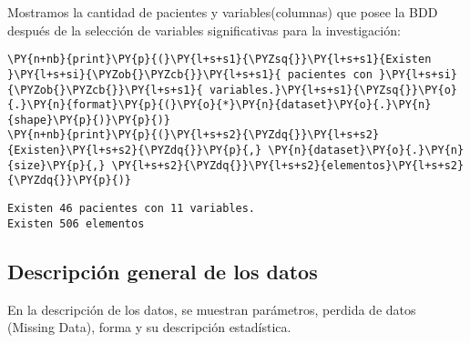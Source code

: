     Mostramos la cantidad de pacientes y variables(columnas) que posee la
BDD después de la selección de variables significativas para la
investigación:

    \begin{tcolorbox}[breakable, size=fbox, boxrule=1pt, pad at break*=1mm,colback=cellbackground, colframe=cellborder]
\begin{Verbatim}[commandchars=\\\{\}]
\PY{n+nb}{print}\PY{p}{(}\PY{l+s+s1}{\PYZsq{}}\PY{l+s+s1}{Existen }\PY{l+s+si}{\PYZob{}\PYZcb{}}\PY{l+s+s1}{ pacientes con }\PY{l+s+si}{\PYZob{}\PYZcb{}}\PY{l+s+s1}{ variables.}\PY{l+s+s1}{\PYZsq{}}\PY{o}{.}\PY{n}{format}\PY{p}{(}\PY{o}{*}\PY{n}{dataset}\PY{o}{.}\PY{n}{shape}\PY{p}{)}\PY{p}{)}
\PY{n+nb}{print}\PY{p}{(}\PY{l+s+s2}{\PYZdq{}}\PY{l+s+s2}{Existen}\PY{l+s+s2}{\PYZdq{}}\PY{p}{,} \PY{n}{dataset}\PY{o}{.}\PY{n}{size}\PY{p}{,} \PY{l+s+s2}{\PYZdq{}}\PY{l+s+s2}{elementos}\PY{l+s+s2}{\PYZdq{}}\PY{p}{)}
\end{Verbatim}
\end{tcolorbox}

    \begin{Verbatim}[commandchars=\\\{\}]
Existen 46 pacientes con 11 variables.
Existen 506 elementos
    \end{Verbatim}

    \hypertarget{descripciuxf3n-general-de-los-datos}{%
\subsection{Descripción general de los
datos}\label{descripciuxf3n-general-de-los-datos}}

En la descripción de los datos, se muestran parámetros, perdida de datos
(Missing Data), forma y su descripción estadística.

